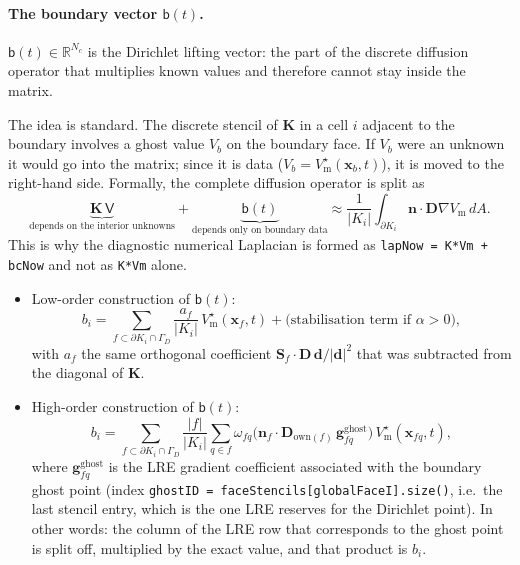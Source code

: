 \documentclass[11pt,a4paper]{article}
\newcommand{\code}[1]{\texttt{\small #1}}
\newcommand{\Vm}{V_{\text{m}}}
\newcommand{\Dten}{\mathbf{D}}
\newcommand{\grad}{\nabla}
\newcommand{\Kstif}{\mathbf{K}}
\newcommand{\R}{\mathbb{R}}
\begin{document}
\paragraph{The boundary vector $\mathsf{b}(t)$.}
$\mathsf{b}(t)\in\R^{N_c}$ is the Dirichlet lifting vector: the part of the
discrete diffusion operator that multiplies known values and therefore cannot
stay inside the matrix.

The idea is standard. The discrete stencil of $\Kstif$ in a cell $i$ adjacent to
the boundary involves a ghost value $V_b$ on the boundary face. If $V_b$ were an
unknown it would go into the matrix; since it is data
($V_b=\Vm^\star(\mathbf{x}_b,t)$), it is moved to the right-hand side. Formally,
the complete diffusion operator is split as
$$
\underbrace{\Kstif\,\mathsf{V}}_{\text{depends on the interior unknowns}} +\underbrace{\mathsf{b}(t)}_{\text{depends only on boundary data}} \approx \frac{1}{|K_i|}\int_{\partial K_i}\mathbf{n}\cdot\Dten\grad\Vm\,dA .
$$
This is why the diagnostic numerical Laplacian is formed as
\code{lapNow = K*Vm + bcNow} and not as \code{K*Vm} alone.

\begin{itemize}
\item Low-order construction of $\mathsf{b}(t)$:
$$
b_i = \sum_{f\subset\partial K_i\cap\Gamma_D}\frac{a_f}{|K_i|}\,\Vm^\star(\mathbf{x}_f,t)+\text{(stabilisation term if }\alpha>0),
$$
with $a_f$ the same orthogonal coefficient
$\mathbf{S}_f\!\cdot\!\Dten\,\mathbf{d}/|\mathbf{d}|^2$ that was subtracted from
the diagonal of $\Kstif$.
\item High-order construction of $\mathsf{b}(t)$:
$$
b_i = \sum_{f\subset\partial K_i\cap\Gamma_D}\frac{|f|}{|K_i|}\sum_{q\in f}\omega_{fq}\Big(\mathbf{n}_f\cdot\Dten_{\mathrm{own}(f)}\,\mathbf{g}^{\text{ghost}}_{fq}\Big)\,\Vm^\star(\mathbf{x}_{fq},t),
$$
where $\mathbf{g}^{\text{ghost}}_{fq}$ is the LRE gradient coefficient
associated with the boundary ghost point (index
\code{ghostID = faceStencils[globalFaceI].size()}, i.e.\ the last stencil entry,
which is the one LRE reserves for the Dirichlet point). In other words: the
column of the LRE row that corresponds to the ghost point is split off,
multiplied by the exact value, and that product is $b_i$.
\end{itemize}
\end{document}
